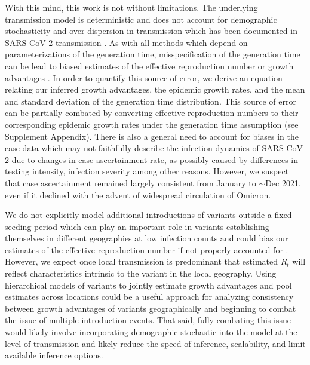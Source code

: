 With this mind, this work is not without limitations.
The underlying transmission model is deterministic and does not account for demographic stochasticity and over-dispersion in transmission which has been documented in SARS-CoV-2 transmission \cite{Wong29416}.
As with all methods which depend on parameterizations of the generation time, misspecification of the generation time can be lead to biased estimates of the effective reproduction number or growth advantages \cite{Gostic2020}.
In order to quantify this source of error, we derive an equation relating our inferred growth advantages, the epidemic growth rates, and the mean and standard deviation of the generation time distribution.
This source of error can be partially combated by converting effective reproduction numbers to their corresponding epidemic growth rates under the generation time assumption (see Supplement Appendix).
There is also a general need to account for biases in the case data which may not faithfully describe the infection dynamics of SARS-CoV-2 due to changes in case ascertainment rate, as possibly caused by differences in testing intensity, infection severity among other reasons.
However, we suspect that case ascertainment remained largely consistent from January to $\sim$Dec 2021, even if it declined with the advent of widespread circulation of Omicron.


We do not explicitly model additional introductions of variants outside a fixed seeding period which can play an important role in variants establishing themselves in different geographies at low infection counts and could bias our estimates of the effective reproduction number if not properly accounted for \cite{Cori2013, MullerWagner2021}.
However, we expect once local transmission is predominant that estimated $R_{t}$ will reflect characteristics intrinsic to the variant in the local geography.
Using hierarchical models of variants to jointly estimate growth advantages and pool estimates across locations could be a useful approach for analyzing consistency between growth advantages of variants geographically and beginning to combat the issue of multiple introduction events.
That said, fully combating this issue would likely involve incorporating demographic stochastic into the model at the level of transmission and likely reduce the speed of inference, scalability, and limit available inference options.

